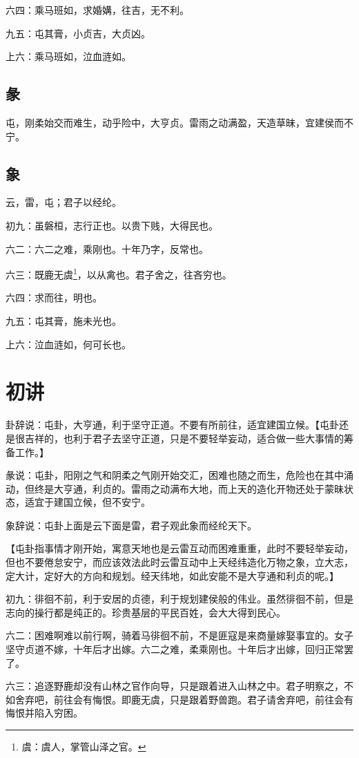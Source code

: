 \documentclass[12pt,oneside]{book}
\begin{document}
六四：乘马班如，求婚媾，往吉，无不利。

九五：屯其膏，小贞吉，大贞凶。

上六：乘马班如，泣血涟如。

\subsection{彖}
屯，刚柔始交而难生，动乎险中，大亨贞。雷雨之动满盈，天造草昧，宜建侯而不宁。

\subsection{象}
云，雷，屯；君子以经纶。

初九：虽磐桓，志行正也。以贵下贱，大得民也。

六二：六二之难，乘刚也。十年乃字，反常也。

六三：既鹿无虞\footnote{虞：虞人，掌管山泽之官。}，以从禽也。君子舍之，往吝穷也。

六四：求而往，明也。

九五：屯其膏，施未光也。

上六：泣血涟如，何可长也。

\section{初讲}
卦辞说：屯卦，大亨通，利于坚守正道。不要有所前往，适宜建国立候。【屯卦还是很吉祥的，也利于君子去坚守正道，只是不要轻举妄动，适合做一些大事情的筹备工作。】

彖说：屯卦，阳刚之气和阴柔之气刚开始交汇，困难也随之而生，危险也在其中涌动，但终是大亨通，利贞的。雷雨之动满布大地，而上天的造化开物还处于蒙昧状态，适宜于建国立候，但不安宁。

象辞说：屯卦上面是云下面是雷，君子观此象而经纶天下。

【屯卦指事情才刚开始，寓意天地也是云雷互动而困难重重，此时不要轻举妄动，但也不要倦怠安宁，而应该效法此时云雷互动中上天经纬造化万物之象，立大志，定大计，定好大的方向和规划。经天纬地，如此安能不是大亨通和利贞的呢。】

初九：徘徊不前，利于安居的贞德，利于规划建侯般的伟业。虽然徘徊不前，但是志向的操行都是纯正的。珍贵基层的平民百姓，会大大得到民心。

六二：困难啊难以前行啊，骑着马徘徊不前，不是匪寇是来商量嫁娶事宜的。女子坚守贞道不嫁，十年后才出嫁。六二之难，柔乘刚也。十年后才出嫁，回归正常罢了。

六三：追逐野鹿却没有山林之官作向导，只是跟着进入山林之中。君子明察之，不如舍弃吧，前往会有悔恨。即鹿无虞，只是跟着野兽跑。君子请舍弃吧，前往会有悔恨并陷入穷困。
\end{document}
